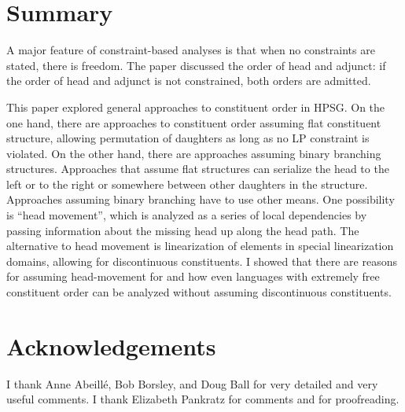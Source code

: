 \documentclass[output=paper
	        ,collection
	        ,collectionchapter
 	        ,biblatex
                ,babelshorthands
                ,newtxmath
                ,draftmode
                ,colorlinks, citecolor=brown
]{langscibook}
\begin{document}
\section{Summary}

A major feature of constraint-based analyses is that when no constraints are stated, there is
freedom. The paper discussed the order of head and adjunct: if the order of head and adjunct is not
constrained, both orders are admitted. 

This paper explored general approaches to constituent order in HPSG. On the one hand, there are
approaches to constituent order assuming flat constituent structure, allowing permutation of daughters as long as no LP
constraint is violated. On the other hand, there are approaches assuming binary branching
structures. Approaches that assume flat structures can serialize the head to the left or to the
right or somewhere between other daughters in the structure. Approaches assuming binary branching
have to use other means. One possibility is ``head movement'', which is analyzed as a series of
local dependencies by passing information about the missing head up along the head path. The
alternative to head movement is linearization of elements in special linearization domains, allowing
for discontinuous constituents. I showed that there are reasons for assuming head-movement for
 and how even languages with extremely free constituent order can be analyzed without assuming
discontinuous constituents.



\section*{Acknowledgements}

I thank Anne Abeillé, Bob Borsley, and Doug Ball for very detailed and very useful comments. I thank
Elizabeth Pankratz for comments and for proofreading.

{\sloppy
\printbibliography[heading=subbibliography,notkeyword=this] 
}
\end{document}
